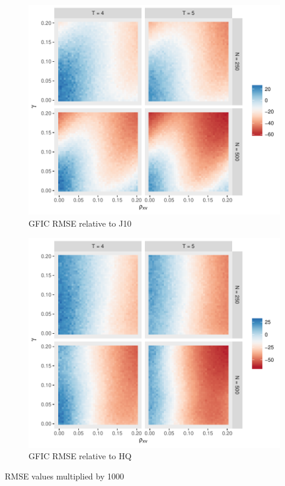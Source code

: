 \begin{figure}
\centering
\includegraphics[scale = 0.8]{./simulations/DynamicPanel/results/Dpanel_GFIC_RMSE_rel_J10}
\caption{GFIC RMSE relative to J10}
\end{figure}

\begin{figure}
\centering
\includegraphics[scale = 0.8]{./simulations/DynamicPanel/results/Dpanel_GFIC_RMSE_rel_HQ}
\caption{GFIC RMSE relative to HQ}
\end{figure}

\begin{table}
  \footnotesize
  \centering
  
  \caption{RMSE values multiplied by 1000}
\end{table}


